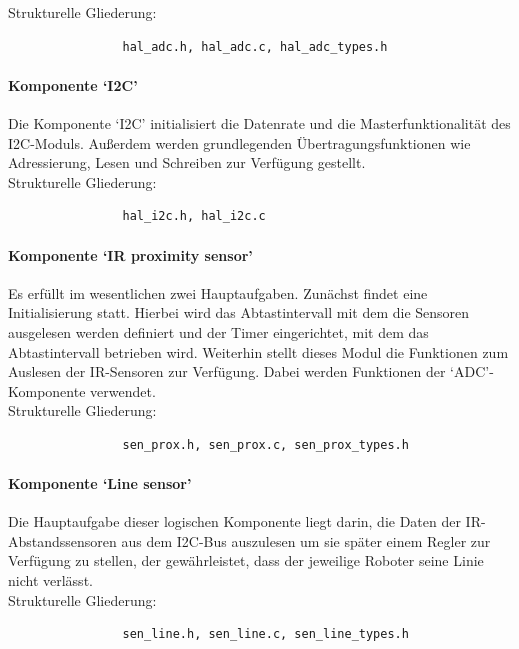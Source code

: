 \documentclass[10pt,a4paper]{article}
\begin{document}
			Strukturelle Gliederung:
				\begin{verbatim}  
				hal_adc.h, hal_adc.c, hal_adc_types.h
				\end{verbatim}
			
			\paragraph*{Komponente `I2C'}
			Die Komponente `I2C' initialisiert die Datenrate und die Masterfunktionalität des I2C-Moduls.
			Außerdem werden grundlegenden Übertragungsfunktionen wie Adressierung, Lesen und Schreiben zur Verfügung gestellt. \\
			
			Strukturelle Gliederung:
				\begin{verbatim}  
				hal_i2c.h, hal_i2c.c
				\end{verbatim}
			
			\paragraph*{Komponente `IR proximity sensor'}
			Es erfüllt im wesentlichen zwei Hauptaufgaben.
			Zunächst findet eine Initialisierung statt. Hierbei wird das Abtastintervall mit dem die Sensoren ausgelesen werden definiert und der 
			Timer eingerichtet, mit dem das Abtastintervall betrieben wird.
			Weiterhin stellt dieses Modul die Funktionen zum Auslesen der IR-Sensoren zur Verfügung. Dabei werden Funktionen der `ADC'-Komponente 		
			verwendet. \\
			
			Strukturelle Gliederung:
				\begin{verbatim}  
				sen_prox.h, sen_prox.c, sen_prox_types.h
				\end{verbatim}
			
			\paragraph*{Komponente `Line sensor'}
			Die Hauptaufgabe dieser logischen Komponente liegt darin, die Daten der IR-Abstandssensoren aus dem I2C-Bus auszulesen um sie später 
			einem Regler zur Verfügung zu stellen, der gewährleistet, dass der jeweilige Roboter seine Linie nicht verlässt. \\
			
			Strukturelle Gliederung:
				\begin{verbatim}  
				sen_line.h, sen_line.c, sen_line_types.h
				\end{verbatim}
			
\end{document}
